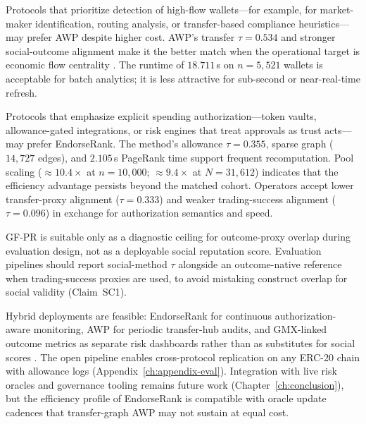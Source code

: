 
Protocols that prioritize detection of high-flow wallets---for example, for market-maker identification, routing analysis, or transfer-based compliance heuristics---may prefer AWP despite higher cost. AWP's transfer $\tau=0.534$ and stronger social-outcome alignment make it the better match when the operational target is economic flow centrality . The runtime of $18.711$\,s on $n=5{,}521$ wallets is acceptable for batch analytics; it is less attractive for sub-second or near-real-time refresh.


Protocols that emphasize explicit spending authorization---token vaults, allowance-gated integrations, or risk engines that treat approvals as trust acts---may prefer EndorseRank. The method's allowance $\tau=0.355$, sparse graph ($14{,}727$ edges), and $2.105$\,s PageRank time support frequent recomputation. Pool scaling ($\approx 10.4\times$ at $n=10{,}000$; $\approx 9.4\times$ at $N=31{,}612$) indicates that the efficiency advantage persists beyond the matched cohort. Operators accept lower transfer-proxy alignment ($\tau=0.333$) and weaker trading-success alignment ($\tau=0.096$) in exchange for authorization semantics and speed.


GF-PR is suitable only as a diagnostic ceiling for outcome-proxy overlap during evaluation design, not as a deployable social reputation score. Evaluation pipelines should report social-method $\tau$ alongside an outcome-native reference when trading-success proxies are used, to avoid mistaking construct overlap for social validity (Claim~SC1).

Hybrid deployments are feasible: EndorseRank for continuous authorization-aware monitoring, AWP for periodic transfer-hub audits, and GMX-linked outcome metrics as separate risk dashboards rather than as substitutes for social scores . The open pipeline enables cross-protocol replication on any ERC-20 chain with allowance logs (Appendix~\ref{ch:appendix-eval}). Integration with live risk oracles and governance tooling remains future work (Chapter~\ref{ch:conclusion}), but the efficiency profile of EndorseRank is compatible with oracle update cadences that transfer-graph AWP may not sustain at equal cost.


